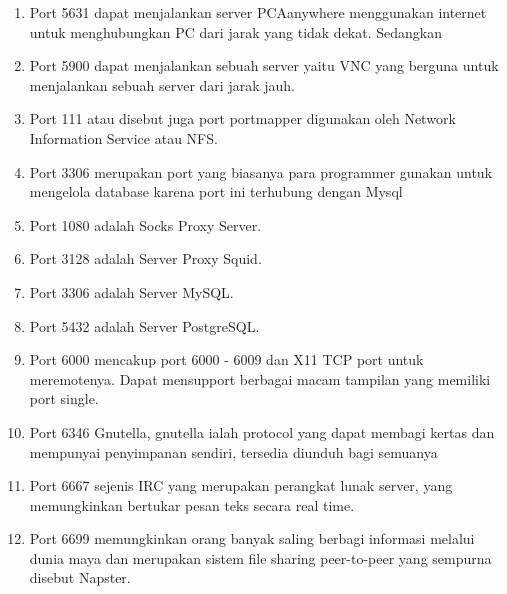 \documentclass[12pt,a4paper]{article}
\begin{document}
\begin{enumerate}
\item Port 5631 dapat menjalankan server PCAanywhere menggunakan internet untuk menghubungkan PC dari jarak yang tidak dekat.
Sedangkan 
\item Port 5900 dapat menjalankan sebuah server yaitu VNC yang berguna untuk menjalankan sebuah server dari jarak jauh.
\item Port 111 atau disebut juga port portmapper digunakan oleh Network Information Service atau NFS.
\item Port 3306 merupakan port yang biasanya para programmer gunakan untuk mengelola database karena port ini terhubung dengan Mysql
\item Port 1080 adalah Socks Proxy Server.
\item Port 3128 adalah Server Proxy Squid.
\item Port 3306 adalah Server MySQL.
\item Port 5432 adalah Server PostgreSQL.
\item Port 6000 mencakup port 6000 - 6009 dan X11 TCP port untuk meremotenya. Dapat mensupport berbagai macam tampilan yang memiliki port single.
\item Port 6346 Gnutella, gnutella ialah protocol yang dapat membagi kertas dan mempunyai penyimpanan sendiri, tersedia diunduh bagi semuanya
\item Port 6667 sejenis IRC yang merupakan perangkat lunak server, yang memungkinkan bertukar pesan teks secara real time.
\item Port 6699 memungkinkan orang banyak saling berbagi informasi melalui dunia maya dan  merupakan sistem file sharing peer-to-peer yang sempurna  disebut Napster.


\end{enumerate}
\end{document}
